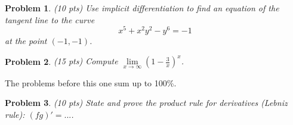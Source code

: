 \documentclass{article}
\newtheorem{problem}{Problem}
\begin{document}
\begin{problem}(10 pts)
Use implicit differentiation to find an equation of the tangent line to the curve 
\[
x^{5}+x^{2}y^2 -y^6=-1
\] 
at the point $(-1, -1)$.
\end{problem}
\newpage 
\begin{problem}(15 pts)
Compute $\lim\limits_{x\to \infty} \left( 1- \frac{3}{x} \right)^x$. 
\end{problem}
\vskip 9cm
The problems before this one sum up to 100\%.
\begin{problem}(10 pts)
State and prove the product rule for derivatives (Lebniz rule): $(fg)'=...$.
\end{problem}
\end{document}
